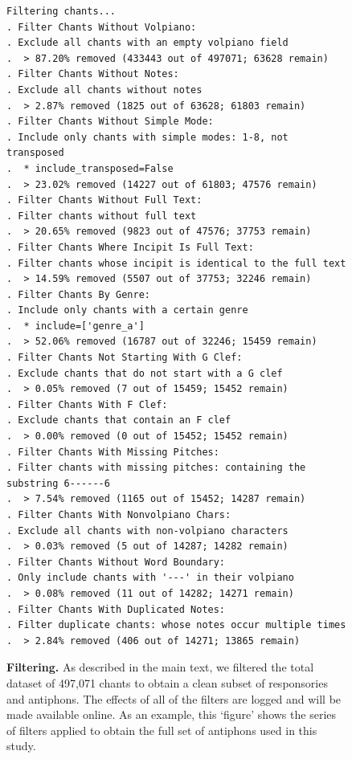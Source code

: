 \documentclass{article}
\begin{document}
\begin{figure}[b!]
\begin{framed}
\small
\begin{verbatim}
Filtering chants...
. Filter Chants Without Volpiano:
. Exclude all chants with an empty volpiano field
.  > 87.20% removed (433443 out of 497071; 63628 remain)
. Filter Chants Without Notes:
. Exclude all chants without notes
.  > 2.87% removed (1825 out of 63628; 61803 remain)
. Filter Chants Without Simple Mode:
. Include only chants with simple modes: 1-8, not transposed
.  * include_transposed=False
.  > 23.02% removed (14227 out of 61803; 47576 remain)
. Filter Chants Without Full Text:
. Filter chants without full text
.  > 20.65% removed (9823 out of 47576; 37753 remain)
. Filter Chants Where Incipit Is Full Text:
. Filter chants whose incipit is identical to the full text
.  > 14.59% removed (5507 out of 37753; 32246 remain)
. Filter Chants By Genre:
. Include only chants with a certain genre
.  * include=['genre_a']
.  > 52.06% removed (16787 out of 32246; 15459 remain)
. Filter Chants Not Starting With G Clef:
. Exclude chants that do not start with a G clef
.  > 0.05% removed (7 out of 15459; 15452 remain)
. Filter Chants With F Clef:
. Exclude chants that contain an F clef
.  > 0.00% removed (0 out of 15452; 15452 remain)
. Filter Chants With Missing Pitches:
. Filter chants with missing pitches: containing the substring 6------6
.  > 7.54% removed (1165 out of 15452; 14287 remain)
. Filter Chants With Nonvolpiano Chars:
. Exclude all chants with non-volpiano characters
.  > 0.03% removed (5 out of 14287; 14282 remain)
. Filter Chants Without Word Boundary:
. Only include chants with '---' in their volpiano
.  > 0.08% removed (11 out of 14282; 14271 remain)
. Filter Chants With Duplicated Notes:
. Filter duplicate chants: whose notes occur multiple times
.  > 2.84% removed (406 out of 14271; 13865 remain)
\end{verbatim}
\end{framed}
    \caption{
        \textbf{Filtering.}
        As described in the main text, we filtered the total dataset of 497,071 chants to obtain a clean subset of responsories and antiphons.
        The effects of all of the filters are logged and will be made available online.
        As an example, this `figure' shows the series of filters applied to obtain the full set of antiphons used in this study.
        \label{suppl:filtering}
    }
\end{figure}
\end{document}
